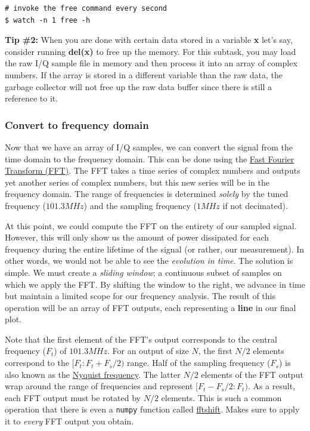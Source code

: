 \begin{lstlisting}[style=bashstyle]
# invoke the free command every second
$ watch -n 1 free -h
\end{lstlisting}

\textbf{Tip \#2:} When you are done with certain data stored in a variable
\textbf{x} let's say, consider running \textbf{del(x)} to free up the memory.
For this subtask, you may load the raw I/Q sample file in memory and then
process it into an array of complex numbers. If the array is stored in a
different variable than the raw data, the garbage collector will not free up
the raw data buffer since there is still a reference to it.

\subsubsection{Convert to frequency domain}

Now that we have an array of I/Q samples, we can convert the signal from the
time domain to the frequency domain. This can be done using the
\href{https://numpy.org/doc/2.1/reference/generated/numpy.fft.fft.html#numpy.fft.fft}
{Fast Fourier Transform (FFT)}. The FFT takes a time series of complex numbers
and outputs yet another series of complex numbers, but this new series will
be in the frequency domain. The range of frequencies is determined
\textit{solely} by the tuned frequency ($101.3MHz$) and the sampling frequency
($1MHz$ if not decimated).

At this point, we could compute the FFT on the entirety of our sampled signal.
However, this will only show us the amount of power dissipated for each frequency
during the entire lifetime of the signal (or rather, our measurement). In other
words, we would not be able to see the \textit{evolution in time}. The solution
is simple. We must create a \textit{sliding window}; a continuous subset of
samples on which we apply the FFT. By shifting the window to the right, we
advance in time but maintain a limited scope for our frequency analysis. The
result of this operation will be an array of FFT outputs, each representing a
\textbf{line} in our final plot.

Note that the first element of the FFT's output corresponds to the central
frequency ($F_t$) of $101.3MHz$. For an output of size $N$, the first $N / 2$
elements correspond to the $[ F_t : F_t + F_s / 2 )$ range. Half of the sampling
frequency ($F_s$) is also known as the
\href{https://en.wikipedia.org/wiki/Nyquist_frequency}{Nyquist frequency}. The
latter $N / 2$ elements of the FFT output wrap around the range of frequencies
and represent $[ F_t - F_s / 2 : F_t )$. As a result, each FFT output must be
rotated by $N / 2$ elements. This is such a common operation that there is even
a \texttt{numpy} function called
\href{https://numpy.org/doc/stable/reference/generated/numpy.fft.fftshift.html}
{fftshift}. Makes sure to apply it to \textit{every} FFT output you obtain.

